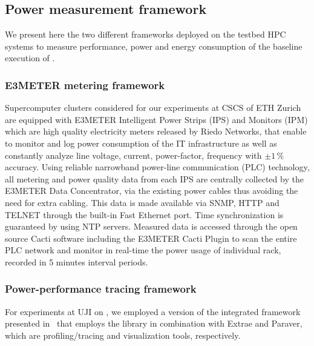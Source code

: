 \subsection{Power measurement framework}
\label{subsec:3.3}

We present here  the two different frameworks deployed  on the testbed
HPC  systems  to measure  performance,  power and  energy
consumption of the baseline execution of \cosmoart.

\subsubsection{E3METER metering framework}

Supercomputer clusters  considered for our experiments at  CSCS of ETH
Zurich are  equipped with E3METER  Intelligent Power Strips  (IPS) and
Monitors (IPM)  which are high quality electricity  meters released by
Riedo Networks,  that enable to  monitor and log power  consumption of
the  IT infrastructure  as well  as constantly  analyze  line voltage,
current, power-factor, frequency  with $\pm1\,\%$ accuracy.  Using reliable
narrowband power-line communication (PLC) technology, all metering and
power  quality data  from  each  IPS are  centrally  collected by  the
E3METER Data Concentrator, via the existing power cables thus avoiding
the need  for extra  cabling.  This data  is made available  via SNMP,
HTTP  and  TELNET  through  the  built-in Fast  Ethernet  port.   Time
synchronization is guaranteed by  using NTP servers.  Measured data is
accessed through the open  source Cacti software including the E3METER
Cacti Plugin to  scan the entire PLC network  and monitor in real-time
the power  usage of  individual rack, recorded  in 5  minutes interval
periods.

\subsubsection{Power-performance tracing framework}

For  experiments  at UJI  on  \tinto, we  employed  a  version of  the
integrated  framework presented  in~\cite{energy13}  that employs  the
\pmlib  library in  combination  with Extrae  and  Paraver, which  are
profiling/tracing and visualization tools, respectively.

